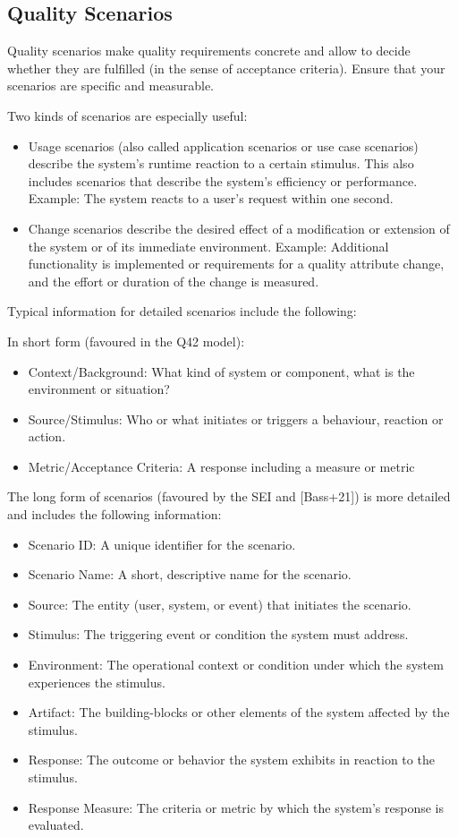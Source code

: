 \subsection{Quality Scenarios}

Quality scenarios make quality requirements concrete and allow to decide whether they are fulfilled (in the sense of acceptance criteria). Ensure that your scenarios are specific and measurable.

Two kinds of scenarios are especially useful:
\begin{itemize}
  \item Usage scenarios (also called application scenarios or use case scenarios) describe the system’s runtime reaction to a certain stimulus. This also includes scenarios that describe the system’s efficiency or performance. Example: The system reacts to a user’s request within one second.
  \item Change scenarios describe the desired effect of a modification or extension of the system or of its immediate environment. Example: Additional functionality is implemented or requirements for a quality attribute change, and the effort or duration of the change is measured.
\end{itemize}

Typical information for detailed scenarios include the following:

In short form (favoured in the Q42 model):
\begin{itemize}
  \item Context/Background: What kind of system or component, what is the environment or situation?
  \item Source/Stimulus: Who or what initiates or triggers a behaviour, reaction or action.
  \item Metric/Acceptance Criteria: A response including a measure or metric
\end{itemize}

The long form of scenarios (favoured by the SEI and [Bass+21]) is more detailed and includes the following information:
\begin{itemize}
  \item Scenario ID: A unique identifier for the scenario.
  \item Scenario Name: A short, descriptive name for the scenario.
  \item Source: The entity (user, system, or event) that initiates the scenario.
  \item Stimulus: The triggering event or condition the system must address.
  \item Environment: The operational context or condition under which the system experiences the stimulus.
  \item Artifact: The building-blocks or other elements of the system affected by the stimulus.
  \item Response: The outcome or behavior the system exhibits in reaction to the stimulus.
  \item Response Measure: The criteria or metric by which the system’s response is evaluated.
\end{itemize}

